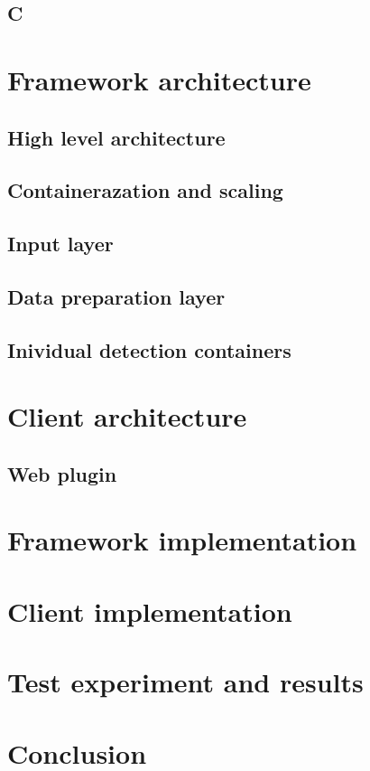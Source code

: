 \section{C}

\chapter{Framework architecture}
\section{High level architecture}
\section{Containerazation and scaling}
\section{Input layer}
\section{Data preparation layer}
\section{Inividual detection containers}

\chapter{Client architecture}
\section{Web plugin}

\chapter{Framework implementation}

\chapter{Client implementation}

\chapter{Test experiment and results}

\chapter{Conclusion}